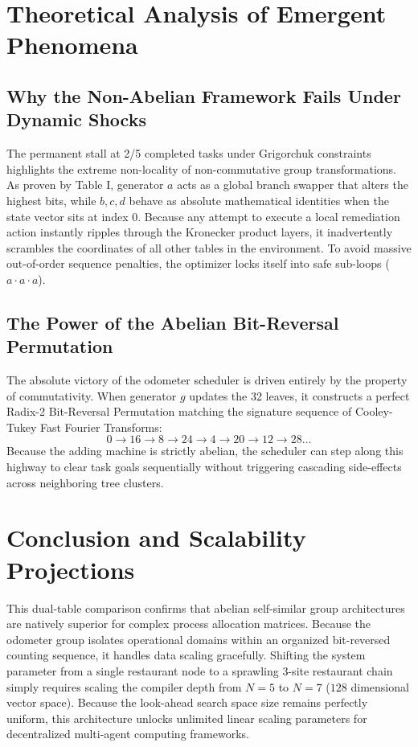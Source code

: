\documentclass[11pt,journal,onecolumn]{IEEEtran}
\begin{document}
\section{Theoretical Analysis of Emergent Phenomena}

\subsection{Why the Non-Abelian Framework Fails Under Dynamic Shocks}
The permanent stall at 2/5 completed tasks under Grigorchuk constraints highlights the extreme non-locality of non-commutative group transformations. As proven by Table I, generator $a$ acts as a global branch swapper that alters the highest bits, while $b, c, d$ behave as absolute mathematical identities when the state vector sits at index 0. Because any attempt to execute a local remediation action instantly ripples through the Kronecker product layers, it inadvertently scrambles the coordinates of all other tables in the environment. To avoid massive out-of-order sequence penalties, the optimizer locks itself into safe sub-loops ($a \cdot a \cdot a$).

\subsection{The Power of the Abelian Bit-Reversal Permutation}
The absolute victory of the odometer scheduler is driven entirely by the property of commutativity. When generator $g$ updates the 32 leaves, it constructs a perfect Radix-2 Bit-Reversal Permutation matching the signature sequence of Cooley-Tukey Fast Fourier Transforms:
\begin{equation}
    0 \rightarrow 16 \rightarrow 8 \rightarrow 24 \rightarrow 4 \rightarrow 20 \rightarrow 12 \rightarrow 28 \dots
\end{equation}
Because the adding machine is strictly abelian, the scheduler can step along this highway to clear task goals sequentially without triggering cascading side-effects across neighboring tree clusters. 

\section{Conclusion and Scalability Projections}
This dual-table comparison confirms that abelian self-similar group architectures are natively superior for complex process allocation matrices. Because the odometer group isolates operational domains within an organized bit-reversed counting sequence, it handles data scaling gracefully. Shifting the system parameter from a single restaurant node to a sprawling 3-site restaurant chain simply requires scaling the compiler depth from $N=5$ to $N=7$ ($128$ dimensional vector space). Because the look-ahead search space size remains perfectly uniform, this architecture unlocks unlimited linear scaling parameters for decentralized multi-agent computing frameworks.
\end{document}
